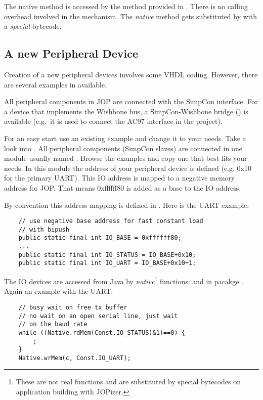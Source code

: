 The native method is accessed by the method provided in
. There is no calling overhead involved in the
mechanism. The \emph{native} method gets substituted by
 with a \emph{special} bytecode.

\subsection{A new Peripheral Device}


Creation of a new peripheral devices involves some VHDL coding.
However, there are several examples in 
available.


All peripheral components in JOP are connected with the SimpCon
\cite{simpcon} interface. For a device that implements the Wishbone
\cite{soc:wishbone} bus, a SimpCon-Wishbone bridge
() is available (e.g.\ it is used to connect the
AC97 interface in the  project).

For an easy start use an existing example and change it to your
needs. Take a look into . All peripheral
components (SimpCon slaves) are connected in one module usually
named . Browse the examples and copy one that
best fits your needs. In this module the address of your peripheral
device is defined (e.g. 0x10 for the primary UART). This IO address
is mapped to a negative memory address for JOP. That means
0xffffff80 is added as a base to the IO address.

By convention this address mapping is defined in
. Here is the UART example:

\begin{verbatim}
    // use negative base address for fast constant load
    // with bipush
    public static final int IO_BASE = 0xffffff80;
    ...
    public static final int IO_STATUS = IO_BASE+0x10;
    public static final int IO_UART = IO_BASE+0x10+1;
\end{verbatim}

The IO devices are accessed from Java by
\emph{native}\footnote{These are not real functions and are
substituted by special bytecodes on application building with
JOPizer.} functions:  and 
in pacakge . Again an example with the UART:

\begin{verbatim}
    // busy wait on free tx buffer
    // no wait on an open serial line, just wait
    // on the baud rate
    while ((Native.rdMem(Const.IO_STATUS)&1)==0) {
        ;
    }
    Native.wrMem(c, Const.IO_UART);
\end{verbatim}

